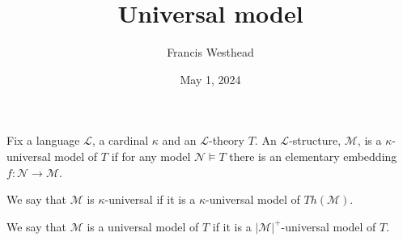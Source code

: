 \documentclass[a4paper]{article}
\title{Universal model}
\date{May 1, 2024}
\author{Francis Westhead}
\begin{document}
\maketitle
\par{Fix a language \(\mathcal {L}\), a cardinal \(\kappa\) and an \(\mathcal {L}\)-theory \(T\). 
An \(\mathcal {L}\)-structure, \(\mathcal {M}\), is a \(\kappa\)-universal model of \(T\) if for any model \(\mathcal {N}  \models  T\)
there is an elementary embedding \(f:  \mathcal {N}  \rightarrow   \mathcal {M}\).}\par{We say that \(\mathcal {M}\) is \(\kappa\)-universal if it is a \(\kappa\)-universal model of \(Th( \mathcal {M})\).}\par{We say that \(\mathcal {M}\) is a universal model of \(T\) if it is a \(| \mathcal {M}|^+\)-universal model of \(T\).}
\printbibliography
\end{document}
